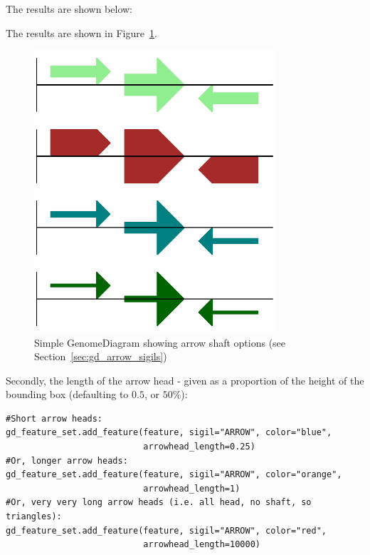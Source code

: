 \documentclass{report}
\begin{document}
\begin{htmlonly}
\noindent The results are shown below:


\end{htmlonly}
\begin{latexonly}
\noindent The results are shown in Figure~\ref{fig:gd_sigil_arrow_shafts}.
\begin{figure}[htbp]
\centering
\includegraphics[width=0.8\textwidth]{images/GD_sigil_arrow_shafts.png}
\caption{Simple GenomeDiagram showing arrow shaft options
(see Section~\ref{sec:gd_arrow_sigils})}
\label{fig:gd_sigil_arrow_shafts}
\end{figure}
\end{latexonly}

Secondly, the length of the arrow head - given as a proportion of the height
of the bounding box (defaulting to $0.5$, or $50\%$):

\begin{verbatim}
#Short arrow heads:
gd_feature_set.add_feature(feature, sigil="ARROW", color="blue",
                           arrowhead_length=0.25)
#Or, longer arrow heads:
gd_feature_set.add_feature(feature, sigil="ARROW", color="orange",
                           arrowhead_length=1)
#Or, very very long arrow heads (i.e. all head, no shaft, so triangles):
gd_feature_set.add_feature(feature, sigil="ARROW", color="red",
                           arrowhead_length=10000)
\end{verbatim}
\end{document}
